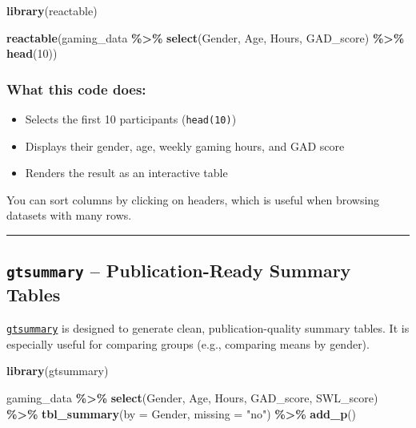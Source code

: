 \documentclass[
]{book}
\newenvironment{Shaded}{\begin{snugshade}}{\end{snugshade}}
\newcommand{\AttributeTok}[1]{\textcolor[rgb]{0.13,0.29,0.53}{#1}}
\newcommand{\DecValTok}[1]{\textcolor[rgb]{0.00,0.00,0.81}{#1}}
\newcommand{\FunctionTok}[1]{\textcolor[rgb]{0.13,0.29,0.53}{\textbf{#1}}}
\newcommand{\NormalTok}[1]{#1}
\newcommand{\SpecialCharTok}[1]{\textcolor[rgb]{0.81,0.36,0.00}{\textbf{#1}}}
\newcommand{\StringTok}[1]{\textcolor[rgb]{0.31,0.60,0.02}{#1}}
\providecommand{\tightlist}{%
  \setlength{\itemsep}{0pt}\setlength{\parskip}{0pt}}
\begin{document}
\begin{Shaded}
\begin{Highlighting}[]
\FunctionTok{library}\NormalTok{(reactable)}

\FunctionTok{reactable}\NormalTok{(gaming\_data }\SpecialCharTok{\%\textgreater{}\%} 
  \FunctionTok{select}\NormalTok{(Gender, Age, Hours, GAD\_score) }\SpecialCharTok{\%\textgreater{}\%} 
  \FunctionTok{head}\NormalTok{(}\DecValTok{10}\NormalTok{))}
\end{Highlighting}
\end{Shaded}

\subsubsection*{What this code does:}\label{what-this-code-does}

\begin{itemize}
\tightlist
\item
  Selects the first 10 participants (\texttt{head(10)})
\item
  Displays their gender, age, weekly gaming hours, and GAD score
\item
  Renders the result as an interactive table
\end{itemize}

You can sort columns by clicking on headers, which is useful when browsing datasets with many rows.

\begin{center}\rule{0.5\linewidth}{0.5pt}\end{center}

\subsection*{\texorpdfstring{\texttt{gtsummary} -- Publication-Ready Summary Tables}{gtsummary -- Publication-Ready Summary Tables}}\label{gtsummary-publication-ready-summary-tables}

\href{https://www.danieldsjoberg.com/gtsummary/}{\texttt{gtsummary}} is designed to generate clean, publication-quality summary tables. It is especially useful for comparing groups (e.g., comparing means by gender).

\begin{Shaded}
\begin{Highlighting}[]
\FunctionTok{library}\NormalTok{(gtsummary)}

\NormalTok{gaming\_data }\SpecialCharTok{\%\textgreater{}\%}
  \FunctionTok{select}\NormalTok{(Gender, Age, Hours, GAD\_score, SWL\_score) }\SpecialCharTok{\%\textgreater{}\%}
  \FunctionTok{tbl\_summary}\NormalTok{(}\AttributeTok{by =}\NormalTok{ Gender, }\AttributeTok{missing =} \StringTok{"no"}\NormalTok{) }\SpecialCharTok{\%\textgreater{}\%}
  \FunctionTok{add\_p}\NormalTok{()}
\end{Highlighting}
\end{Shaded}
\end{document}
